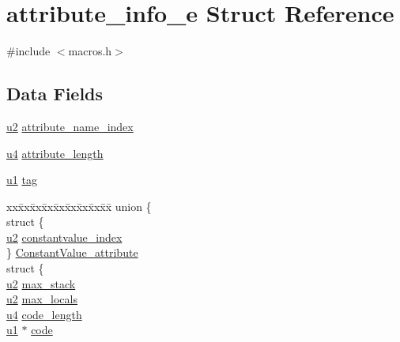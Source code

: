 \hypertarget{structattribute__info__e}{}\section{attribute\+\_\+info\+\_\+e Struct Reference}
\label{structattribute__info__e}


{\ttfamily \#include $<$macros.\+h$>$}

\subsection*{Data Fields}
\begin{DoxyCompactItemize}
\item 
\hyperlink{macros_8h_a732cde1300aafb73b0ea6c2558a7a54f}{u2} \hyperlink{structattribute__info__e_ab5b819d131cf1a027c1a3557de323356}{attribute\+\_\+name\+\_\+index}
\item 
\hyperlink{macros_8h_ae5be1f726785414dd1b77d60df074c9d}{u4} \hyperlink{structattribute__info__e_a2bff602f8458d617a1b4aca0b9b2038e}{attribute\+\_\+length}
\item 
\hyperlink{macros_8h_ad9f4cdb6757615aae2fad89dab3c5470}{u1} \hyperlink{structattribute__info__e_a17726ed17c64ec8550633ebf17fd1a98}{tag}
\item 
\begin{tabbing}
xx\=xx\=xx\=xx\=xx\=xx\=xx\=xx\=xx\=\kill
union \{\\
\>struct \{\\
\>\>\hyperlink{macros_8h_a732cde1300aafb73b0ea6c2558a7a54f}{u2} \hyperlink{structattribute__info__e_a424974de8f91ea7fffd9e3b78c55a028}{constantvalue\_index}\\
\>\} \hyperlink{structattribute__info__e_a870df7603ff8f8df965d0886e2efb0ac}{ConstantValue\_attribute}\\
\>struct \{\\
\>\>\hyperlink{macros_8h_a732cde1300aafb73b0ea6c2558a7a54f}{u2} \hyperlink{structattribute__info__e_adbac44dc0fa76325c65aef553a371cdf}{max\_stack}\\
\>\>\hyperlink{macros_8h_a732cde1300aafb73b0ea6c2558a7a54f}{u2} \hyperlink{structattribute__info__e_af89d2b754585c4aa73f27ed54e9b69de}{max\_locals}\\
\>\>\hyperlink{macros_8h_ae5be1f726785414dd1b77d60df074c9d}{u4} \hyperlink{structattribute__info__e_a67fc7666df284938e4ce4eb69bd75d10}{code\_length}\\
\>\>\hyperlink{macros_8h_ad9f4cdb6757615aae2fad89dab3c5470}{u1} $\ast$ \hyperlink{structattribute__info__e_a83424ffc7afb5e85f548fa9a222cbef4}{code}\\

\end{tabbing}
\end{DoxyCompactItemize}
